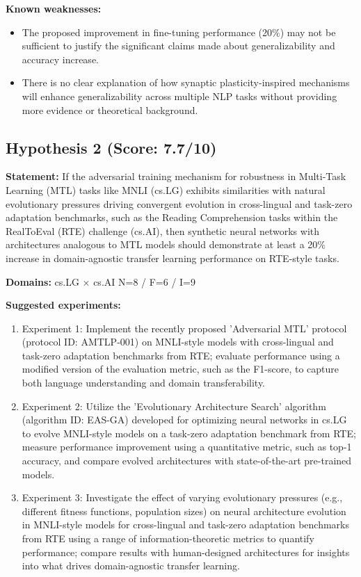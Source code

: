 \documentclass[12pt,a4paper]{article}
\begin{document}
\textbf{Known weaknesses:}
\begin{itemize}
  \item The proposed improvement in fine-tuning performance (20\%) may not be sufficient to justify the significant claims made about generalizability and accuracy increase.
  \item There is no clear explanation of how synaptic plasticity-inspired mechanisms will enhance generalizability across multiple NLP tasks without providing more evidence or theoretical background.
\end{itemize}
\subsection*{Hypothesis 2 (Score: 7.7/10)}

\textbf{Statement:} If the adversarial training mechanism for robustness in Multi-Task Learning (MTL) tasks like MNLI (cs.LG) exhibits similarities with natural evolutionary pressures driving convergent evolution in cross-lingual and task-zero adaptation benchmarks, such as the Reading Comprehension tasks within the RealToEval (RTE) challenge (cs.AI), then synthetic neural networks with architectures analogous to MTL models should demonstrate at least a 20\% increase in domain-agnostic transfer learning performance on RTE-style tasks.

\noindent\textbf{Domains:} cs.LG $\times$ cs.AI
\hspace{1em} N=8 / F=6 / I=9

\textbf{Suggested experiments:}
\begin{enumerate}
  \item Experiment 1: Implement the recently proposed 'Adversarial MTL' protocol (protocol ID: AMTLP-001) on MNLI-style models with cross-lingual and task-zero adaptation benchmarks from RTE; evaluate performance using a modified version of the evaluation metric, such as the F1-score, to capture both language understanding and domain transferability.
  \item Experiment 2: Utilize the 'Evolutionary Architecture Search' algorithm (algorithm ID: EAS-GA) developed for optimizing neural networks in cs.LG to evolve MNLI-style models on a task-zero adaptation benchmark from RTE; measure performance improvement using a quantitative metric, such as top-1 accuracy, and compare evolved architectures with state-of-the-art pre-trained models.
  \item Experiment 3: Investigate the effect of varying evolutionary pressures (e.g., different fitness functions, population sizes) on neural architecture evolution in MNLI-style models for cross-lingual and task-zero adaptation benchmarks from RTE using a range of information-theoretic metrics to quantify performance; compare results with human-designed architectures for insights into what drives domain-agnostic transfer learning.
\end{enumerate}
\end{document}
